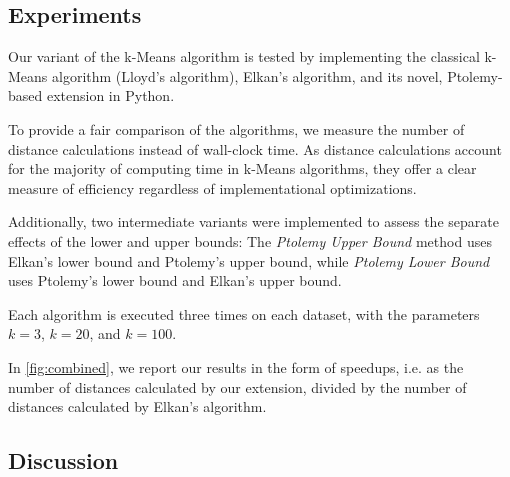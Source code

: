 \subsection{Experiments}
Our variant of the k-Means algorithm is tested by implementing the classical k-Means algorithm (Lloyd's algorithm), Elkan's algorithm, and its novel, Ptolemy-based extension in Python.

To provide a fair comparison of the algorithms,
we measure the number of distance calculations instead of wall-clock time.
As distance calculations account for the majority of computing time in k-Means algorithms, they offer a clear measure of efficiency regardless of implementational optimizations.

Additionally, two intermediate variants were implemented to assess the separate effects of the lower and upper bounds:
The \emph{Ptolemy Upper Bound} method uses Elkan's lower bound and Ptolemy's upper bound, while \emph{Ptolemy Lower Bound} uses Ptolemy's lower bound and Elkan's upper bound.

Each algorithm is executed three times on each dataset, with the parameters $k = 3$, $k = 20$, and $k = 100$.

In \autoref{fig:combined},
we report our results in the form of speedups,
i.e. as the number of distances calculated by our extension,
divided by the number of distances calculated by Elkan's algorithm.



\subsection{Discussion}


